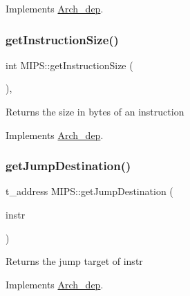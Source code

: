Implements \hyperlink{classArch__dep_ae9c1e0474e6414808dc6c8658ef0ddba}{Arch\+\_\+dep}.

\mbox{\label{classMIPS_ad192996344511aa0152adf644cf84238}} 
\subsubsection{\texorpdfstring{get\+Instruction\+Size()}{getInstructionSize()}}
{\footnotesize\ttfamily int M\+I\+P\+S\+::get\+Instruction\+Size (\begin{DoxyParamCaption}{ }\end{DoxyParamCaption})\hspace{0.3cm}{\ttfamily [inline]}, {\ttfamily [virtual]}}

Returns the size in bytes of an instruction 

Implements \hyperlink{classArch__dep_a845395b8503a23b2c192e8b4a05ccba9}{Arch\+\_\+dep}.

\mbox{\label{classMIPS_a64b2312c1817faef2ca139497ffa7ec9}} 
\subsubsection{\texorpdfstring{get\+Jump\+Destination()}{getJumpDestination()}}
{\footnotesize\ttfamily t\+\_\+address M\+I\+P\+S\+::get\+Jump\+Destination (\begin{DoxyParamCaption}\item[{const \hyperlink{classObjdumpInstruction}{Objdump\+Instruction} \&}]{instr }\end{DoxyParamCaption})\hspace{0.3cm}{\ttfamily [virtual]}}

Returns the jump target of instr 

Implements \hyperlink{classArch__dep_a78780a4581807e2974057810e6aaa6c1}{Arch\+\_\+dep}.

\mbox{\label{classMIPS_a2aa733a21db8dc973feddaac233d66a2}} 
